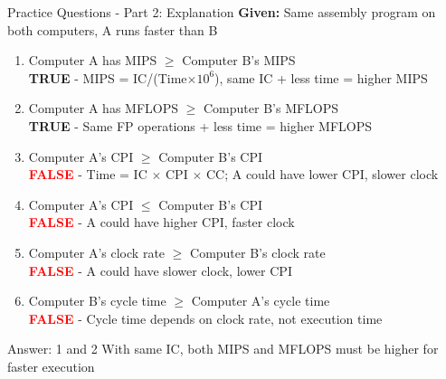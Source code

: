 \documentclass[aspectratio=169,12pt]{beamer}
\begin{document}
\begin{frame}{Practice Questions - Part 2: Explanation}
\scriptsize
\textbf{Given:} Same assembly program on both computers, A runs faster than B

\begin{enumerate}
    \scriptsize
    \item Computer A has MIPS $\geq$ Computer B's MIPS\\
    \pause
    \hspace{1em}\colorbox{green!20}{\textcolor{green!50!black}{\textbf{TRUE}}} - MIPS = IC/(Time$\times 10^6$), same IC + less time = higher MIPS
    \pause
    
    \item Computer A has MFLOPS $\geq$ Computer B's MFLOPS\\
    \pause
    \hspace{1em}\colorbox{green!20}{\textcolor{green!50!black}{\textbf{TRUE}}} - Same FP operations + less time = higher MFLOPS
    \pause
    
    \item Computer A's CPI $\geq$ Computer B's CPI\\
    \pause
    \hspace{1em}\colorbox{red!20}{\textcolor{red}{\textbf{FALSE}}} - Time = IC $\times$ CPI $\times$ CC; A could have lower CPI, slower clock
    \pause
    
    \item Computer A's CPI $\leq$ Computer B's CPI\\
    \pause
    \hspace{1em}\colorbox{red!20}{\textcolor{red}{\textbf{FALSE}}} - A could have higher CPI, faster clock
    \pause
    
    \item Computer A's clock rate $\geq$ Computer B's clock rate\\
    \pause
    \hspace{1em}\colorbox{red!20}{\textcolor{red}{\textbf{FALSE}}} - A could have slower clock, lower CPI
    \pause
    
    \item Computer B's cycle time $\geq$ Computer A's cycle time\\
    \pause
    \hspace{1em}\colorbox{red!20}{\textcolor{red}{\textbf{FALSE}}} - Cycle time depends on clock rate, not execution time
\end{enumerate}

\pause
\begin{alertblock}{Answer: 1 and 2}
With same IC, both MIPS and MFLOPS must be higher for faster execution
\end{alertblock}
\end{frame}
\end{document}
